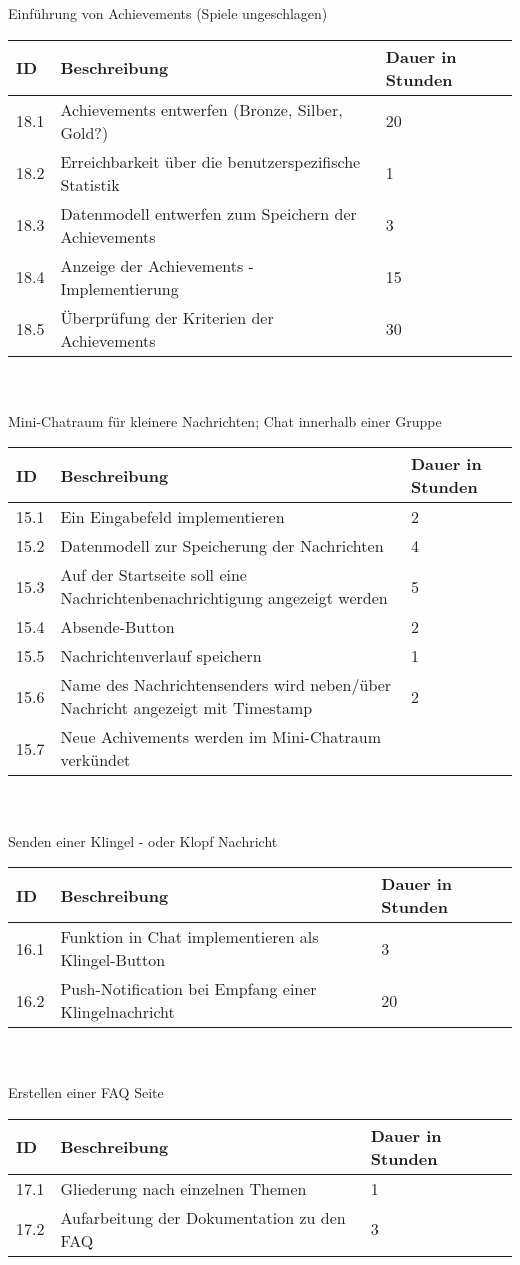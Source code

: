 Einführung von Achievements (Spiele ungeschlagen)\\
\begin{tabular}[h]{|p{1cm}|p{10cm}|p{3cm}|}
\hline 
ID & Beschreibung & Dauer in Stunden \\ \hline
18.1 & Achievements entwerfen (Bronze, Silber, Gold?) & 20 \\ \hline
18.2 & Erreichbarkeit über die benutzerspezifische Statistik & 1 \\ \hline
18.3 & Datenmodell entwerfen zum Speichern der Achievements & 3 \\ \hline
18.4 & Anzeige der Achievements - Implementierung & 15 \\ \hline
18.5 & Überprüfung der Kriterien der Achievements & 30 \\ \hline
\end{tabular}\\ \\
Mini-Chatraum für kleinere Nachrichten; Chat innerhalb einer Gruppe\\
\begin{tabular}[h]{|p{1cm}|p{10cm}|p{3cm}|}
\hline 
ID & Beschreibung & Dauer in Stunden \\ \hline
15.1 & Ein Eingabefeld implementieren & 2 \\ \hline
15.2 & Datenmodell zur Speicherung der Nachrichten & 4 \\ \hline
15.3 & Auf der Startseite soll eine Nachrichtenbenachrichtigung angezeigt werden & 5 \\ \hline
15.4 & Absende-Button & 2 \\ \hline
15.5 & Nachrichtenverlauf speichern & 1 \\ \hline
15.6 & Name des Nachrichtensenders wird neben/über Nachricht angezeigt mit Timestamp & 2 \\ \hline
15.7 & Neue Achivements werden im Mini-Chatraum verkündet & \\ \hline
\end{tabular}\\ \\
Senden einer Klingel - oder Klopf Nachricht\\
\begin{tabular}[h]{|p{1cm}|p{10cm}|p{3cm}|}
\hline 
ID & Beschreibung & Dauer in Stunden \\ \hline
16.1 & Funktion in Chat implementieren als Klingel-Button & 3 \\ \hline
16.2 & Push-Notification bei Empfang einer Klingelnachricht & 20 \\ \hline
\end{tabular}\\ \\
Erstellen einer FAQ Seite\\
\begin{tabular}[h]{|p{1cm}|p{10cm}|p{3cm}|}
\hline 
ID & Beschreibung & Dauer in Stunden \\ \hline
17.1 & Gliederung nach einzelnen Themen & 1	\\ \hline
17.2 & Aufarbeitung der Dokumentation zu den FAQ & 3 \\ \hline
\end{tabular}
	